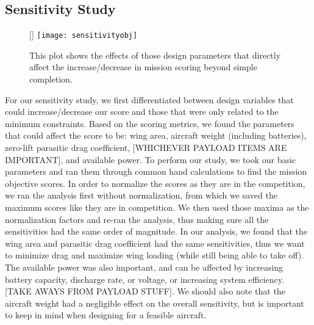 \documentclass[proposal]{byu-aero}
\begin{document}
\lipsum[1-5]


\subsection{Sensitivity Study}
\label{ssec:SensitivityStudy}

\begin{figure}
	\centering
	\raisebox{0pt}[\dimexpr{}\baselineskip\relax]{
		\texttt{[image: sensitivityobj]}
	}
	\caption{This plot shows the effects of those design parameters that directly affect the increase/decrease in mission scoring beyond simple completion.}
	\label{fig:sensitivity}
\end{figure}
For our sensitivity study, we first differentiated between design variables that could increase/decrease our score and those that were only related to the minimum constraints.  Based on the scoring metrics, we found the parameters that could affect the score to be: wing area, aircraft weight (including batteries), zero-lift parasitic drag coefficient, {\color{BYUred}[WHICHEVER PAYLOAD ITEMS ARE IMPORTANT]}, and available power.  To perform our study, we took our basic parameters and ran them through common hand calculations to find the mission objective scores. In order to normalize the scores as they are in the competition, we ran the analysis first without normalization, from which we saved the maximum scores like they are in competition. We then used those maxima as the normalization factors and re-ran the analysis, thus making sure all the sensitivities had the same order of magnitude.  In our analysis, we found that the wing area and parasitic drag coefficient had the same sensitivities, thus we want to minimize drag and maximize wing loading (while still being able to take off).  The available power was also important, and can be affected by increasing battery capacity, discharge rate, or voltage, or increasing system efficiency. {\color{BYUred}[TAKE AWAYS FROM PAYLOAD STUFF]}. We should also note that the aircraft weight had a negligible effect on the overall sensitivity, but is important to keep in mind when designing for a feasible aircraft.
\end{document}
